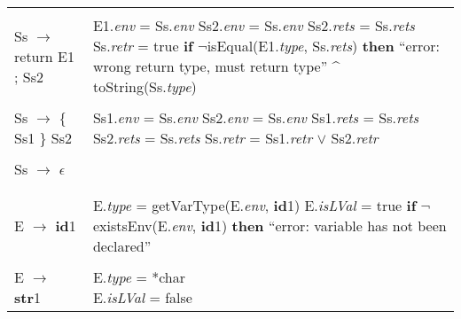 \documentclass{article}
\begin{document}
\begin{center}
\begin{longtable}{ |l|l| }
     & \\
     
    Ss $\rightarrow$ return E1 ; Ss2 & \makecell[l]{E1.\textit{env} = Ss.\textit{env} \\ Ss2.\textit{env} = Ss.\textit{env} \\ Ss2.\textit{rets} = Ss.\textit{rets} \\ Ss.\textit{retr} = true \\ \textbf{if} $\neg$isEqual(E1.\textit{type}, Ss.\textit{rets}) \\ \textbf{then} ``error: wrong return type, must return type'' \^{} \\ toString(Ss.\textit{type})} \\
     
     & \\
     
    Ss $\rightarrow$ \{ Ss1 \} Ss2 & \makecell[l]{Ss1.\textit{env} = Ss.\textit{env} \\ Ss2.\textit{env} = Ss.\textit{env} \\ Ss1.\textit{rets} = Ss.\textit{rets} \\ Ss2.\textit{rets} = Ss.\textit{rets} \\ Ss.\textit{retr} = Ss1.\textit{retr} $\lor$ Ss2.\textit{retr}} \\
     
     & \\
     
    Ss $\rightarrow$ $\epsilon$ & \\
     
     & \\
    
    \hline
    
    & \\

    E $\rightarrow$ \textbf{id}1 & \makecell[l]{E.\textit{type} = getVarType(E.\textit{env}, \textbf{id}1) \\ E.\textit{isLVal} = true \\ \textbf{if} $\neg$existsEnv(E.\textit{env}, \textbf{id}1) \\ \textbf{then} ``error: variable has not been declared''} \\
    
     & \\
    
    E $\rightarrow$ \textbf{str}1 & \makecell[l]{E.\textit{type} = *char \\ E.\textit{isLVal} = false} \\
    

\end{longtable}
\end{center}
\end{document}
